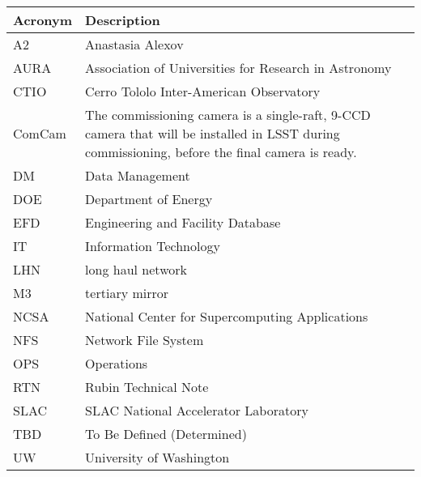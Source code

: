 \addtocounter{table}{-1}
\begin{longtable}{p{}p{}}\hline
\textbf{Acronym} & \textbf{Description}  \\\hline

A2 & Anastasia Alexov \\\hline
AURA & Association of Universities for Research in Astronomy \\\hline
CTIO & Cerro Tololo Inter-American Observatory \\\hline
ComCam & The commissioning camera is a single-raft, 9-CCD camera that will be installed in LSST during commissioning, before the final camera is ready. \\\hline
DM & Data Management \\\hline
DOE & Department of Energy \\\hline
EFD & Engineering and Facility Database \\\hline
IT & Information Technology \\\hline
LHN & long haul network \\\hline
M3 & tertiary mirror \\\hline
NCSA & National Center for Supercomputing Applications \\\hline
NFS & Network File System \\\hline
OPS & Operations \\\hline
RTN & Rubin Technical Note \\\hline
SLAC & SLAC National Accelerator Laboratory \\\hline
TBD & To Be Defined (Determined) \\\hline
UW & University of Washington \\\hline
\end{longtable}
